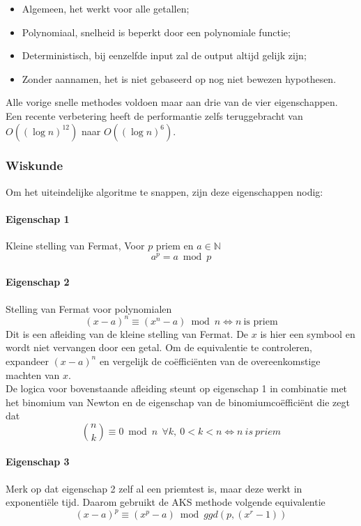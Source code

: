 \documentclass[11pt]{article}
\begin{document}
\begin{itemize}
	\item Algemeen, het werkt voor alle getallen;
	\item Polynomiaal, snelheid is beperkt door een polynomiale functie;
	\item Deterministisch, bij eenzelfde input zal de output altijd gelijk zijn;
	\item Zonder aannamen, het is niet gebaseerd op nog niet bewezen hypothesen.
\end{itemize}
Alle vorige snelle methodes voldoen maar aan drie van de vier eigenschappen.
\\
Een recente verbetering heeft de performantie zelfs teruggebracht van $O((\log{n})^{12})$ naar $O((\log{n})^{6})$.

\subsubsection{Wiskunde}
Om het uiteindelijke algoritme te snappen, zijn deze eigenschappen nodig:
\paragraph{Eigenschap 1}
Kleine stelling van Fermat, Voor $p$ priem en $a \in \mathbb{N}$
$$a^p = a \bmod{p}$$

\paragraph{Eigenschap 2}
Stelling van Fermat voor polynomialen
$$(x-a)^n \equiv (x^n-a) \bmod{n} \Leftrightarrow n\ \mbox{is priem}$$
Dit is een afleiding van de kleine stelling van Fermat. De $x$ is hier een symbool en wordt niet vervangen door een getal. Om de equivalentie te controleren, expandeer $(x-a)^n$ en vergelijk de coëfficiënten van de overeenkomstige machten van $x$.
\\
De logica voor bovenstaande afleiding steunt op eigenschap 1 in combinatie met het binomium van Newton en de eigenschap van de binomiumcoëfficiënt die zegt dat $$ \binom {n} {k} \equiv 0 \bmod{n}\ \ \forall k,\ 0<k<n \Leftrightarrow n\ is\ priem$$

\paragraph{Eigenschap 3}
Merk op dat eigenschap 2 zelf al een priemtest is, maar deze werkt in exponentiële tijd. Daarom gebruikt de AKS methode volgende equivalentie
$$(x-a)^p \equiv (x^p-a) \bmod{ggd(p, (x^r-1))}$$
\end{document}
